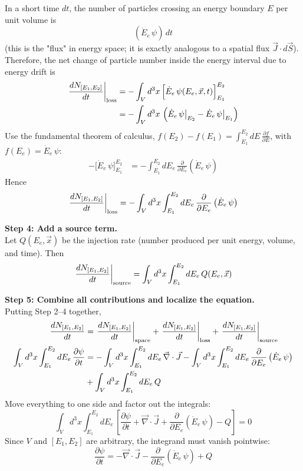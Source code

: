 \begin{foundation}
    In a short time $dt$, the number of particles crossing an energy boundary $E$ per unit volume is
    \[
        \left(\dot{E}_e\,\psi\right)\,dt
    \]
    (this is the "flux" in energy space; it is exactly analogous to a spatial flux $\vec{J}\cdot d\vec{S}$). Therefore, the net change of particle number inside the energy interval due to energy drift is
    \begin{align*}
        \left.\frac{dN_{[E_1,E_2]}}{dt}\right|_{\rm loss}
        &= -\int_V d^3x\, \Big[\dot{E}_e\,\psi(E_e,\vec{x},t)\Big]_{E_1}^{E_2} \\
        &= -\int_V d^3x\, \left(\dot{E}_e\,\psi\big|_{E_2} - \dot{E}_e\,\psi\big|_{E_1}\right)
    \end{align*}
    Use the fundamental theorem of calculus, $f(E_2)-f(E_1)=\int_{E_1}^{E_2} dE\, \frac{\partial f}{\partial E}$, with $f(E_e)=\dot{E}_e\,\psi$:
    \begin{align*}
        -\Big[\dot{E}_e\,\psi\Big]_{E_1}^{E_2}
        &= -\int_{E_1}^{E_2} dE_e\, \frac{\partial}{\partial E_e}\left(\dot{E}_e\,\psi\right)
    \end{align*}
    Hence
    \[
        \left.\frac{dN_{[E_1,E_2]}}{dt}\right|_{\rm loss}
        = -\int_V d^3x\int_{E_1}^{E_2} dE_e\, \frac{\partial}{\partial E_e}\left(\dot{E}_e\,\psi\right)
    \]

    \textbf{Step 4: Add a source term.} \\
    Let $Q(E_e,\vec{x})$ be the injection rate (number produced per unit energy, volume, and time). Then
    \[
        \left.\frac{dN_{[E_1,E_2]}}{dt}\right|_{\rm source} = \int_V d^3x\int_{E_1}^{E_2} dE_e\, Q(E_e, \vec{x})
    \]

    \textbf{Step 5: Combine all contributions and localize the equation.} \\
    Putting Step 2--4 together,
    \begin{align*}
        \frac{dN_{[E_1,E_2]}}{dt}
        &= \left.\frac{dN_{[E_1,E_2]}}{dt}\right|_{\rm space}
        + \left.\frac{dN_{[E_1,E_2]}}{dt}\right|_{\rm loss}
        + \left.\frac{dN_{[E_1,E_2]}}{dt}\right|_{\rm source} \\
        \int_V d^3x \int_{E_1}^{E_2} dE_e\, \frac{\partial \psi}{\partial t}
        &= -\int_V d^3x\int_{E_1}^{E_2} dE_e\, \vec{\nabla}\cdot \vec{J}
        -\int_V d^3x\int_{E_1}^{E_2} dE_e\, \frac{\partial}{\partial E_e}\left(\dot{E}_e\,\psi\right) \\
        & +\int_V d^3x\int_{E_1}^{E_2} dE_e\, Q
    \end{align*}
    Move everything to one side and factor out the integrals:
    \[
        \int_V d^3x\int_{E_1}^{E_2} dE_e\, \left[
            \frac{\partial \psi}{\partial t}
            + \vec{\nabla}\cdot \vec{J}
            + \frac{\partial}{\partial E_e}\left(\dot{E}_e\,\psi\right)
            - Q
        \right] = 0
    \]
    Since $V$ and $[E_1,E_2]$ are arbitrary, the integrand must vanish pointwise:
    \[
        \frac{\partial \psi}{\partial t}
        = -\vec{\nabla}\cdot \vec{J}
        - \frac{\partial}{\partial E_e}\left(\dot{E}_e\,\psi\right)
        + Q
    \]


\end{foundation}
